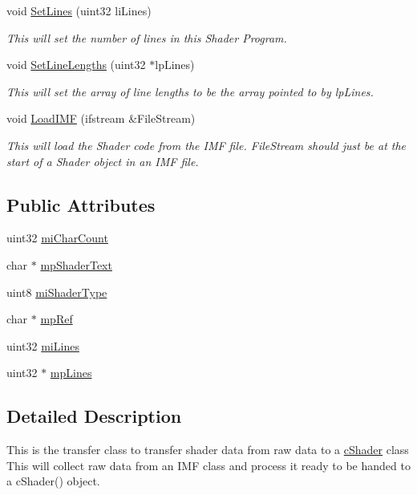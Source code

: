 \begin{DoxyCompactItemize}
void \hyperlink{classc_shader_array_a8c20a1e6625ea65d113747c169313cc0}{SetLines} (uint32 liLines)
\begin{DoxyCompactList}\small\item\em This will set the number of lines in this Shader Program. \item\end{DoxyCompactList}\item 
void \hyperlink{classc_shader_array_a32ed770609a7be20a27be8f981dbfd78}{SetLineLengths} (uint32 $\ast$lpLines)
\begin{DoxyCompactList}\small\item\em This will set the array of line lengths to be the array pointed to by lpLines. \item\end{DoxyCompactList}\item 
void \hyperlink{classc_shader_array_a8c70ada7026d9405f592c0f2ead15e6a}{LoadIMF} (ifstream \&FileStream)
\begin{DoxyCompactList}\small\item\em This will load the Shader code from the IMF file. FileStream should just be at the start of a Shader object in an IMF file. \item\end{DoxyCompactList}\end{DoxyCompactItemize}
\subsection*{Public Attributes}
\begin{DoxyCompactItemize}
\item 
uint32 \hyperlink{classc_shader_array_a148ffa979b89aadd045f69398c0816cb}{miCharCount}
\item 
char $\ast$ \hyperlink{classc_shader_array_a17b2519868bbc5a40db2222a42a6dd84}{mpShaderText}
\item 
uint8 \hyperlink{classc_shader_array_a6d584d6547232ff18e4bcc6c92343b99}{miShaderType}
\item 
char $\ast$ \hyperlink{classc_shader_array_af44e6ae486efc2576faa43df52d14e33}{mpRef}
\item 
uint32 \hyperlink{classc_shader_array_af36e89da0296b5e725db06b6e03e87c0}{miLines}
\item 
uint32 $\ast$ \hyperlink{classc_shader_array_a7f5dbee262a24fed2cdcf2f241afa639}{mpLines}
\end{DoxyCompactItemize}


\subsection{Detailed Description}
This is the transfer class to transfer shader data from raw data to a \hyperlink{classc_shader}{cShader} class This will collect raw data from an IMF class and process it ready to be handed to a cShader() object. 

